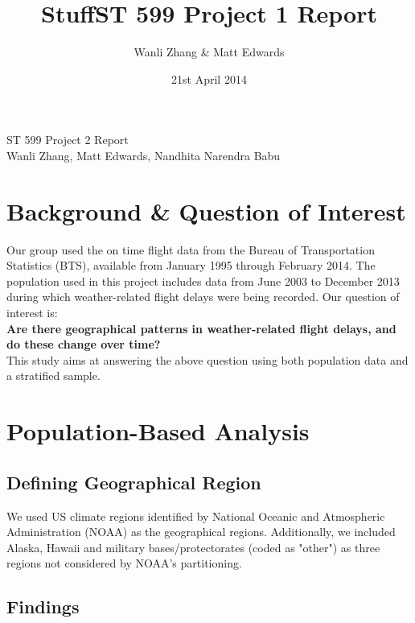 \documentclass{article}
\title{\vspace{-2.0cm}Stuff}
\title{ST 599 Project 1 Report}
\author{Wanli Zhang \& Matt Edwards}
\date{21st April 2014}
\begin{document}
%

\begingroup  
  \centering
  \LARGE ST 599 Project 2 Report\\[1em]
  \large Wanli Zhang, Matt Edwards, Nandhita Narendra Babu\par
\endgroup



\section{Background \& Question of Interest}
Our group used the on time flight data from the Bureau of Transportation Statistics (BTS), available from January 1995 through February 2014. The population used in this project includes data from June 2003 to December 2013 during which weather-related flight delays were being recorded. Our question of interest is:\\

\textbf{Are there geographical patterns in weather-related flight delays, and do these change over time?}\\

This study aims at answering the above question using both population data and a stratified sample.



\section{Population-Based Analysis}
\subsection{Defining Geographical Region}
We used US climate regions identified by National Oceanic and Atmospheric Administration (NOAA) as the geographical regions. Additionally, we included Alaska, Hawaii and military bases/protectorates (coded as "other") as three regions not considered by NOAA's partitioning.


\subsection{Findings}
\end{document}
